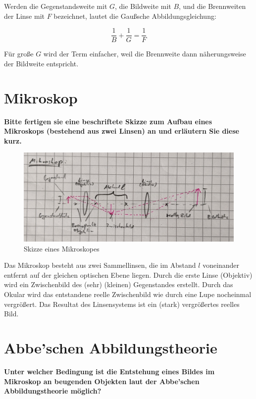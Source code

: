 \documentclass[a4paper, 12pt]{article}
\begin{document}
Werden die Gegenstandsweite mit $G$, die Bildweite mit $B$, und die Brennweiten der Linse mit $F$ bezeichnet, lautet die Gaußsche Abbildungsgleichung:

$$\frac{1}{B}+\frac{1}{G} = \frac{1}{F}$$

Für große $G$ wird der Term einfacher, weil die Brennweite dann näherungsweise der Bildweite entspricht.

\newpage
\section{Mikroskop}
\textbf{Bitte fertigen sie eine beschriftete Skizze zum Aufbau eines Mikroskops (bestehend aus zwei Linsen) an und erläutern Sie diese kurz.}

\begin{figure}[h]
\centering
	\includegraphics[width=\textwidth]{mikroskop.png}
	\caption{Skizze eines Mikroskopes}
\end{figure}

Das Mikroskop besteht aus zwei Sammellinsen, die im Abstand $l$ voneinander entfernt auf der gleichen optischen Ebene liegen. 
Durch die erste Linse (Objektiv) wird ein Zwischenbild des (sehr) (kleinen) Gegenstandes erstellt.
Durch das Okular wird das entstandene reelle Zwischenbild wie durch eine Lupe nocheinmal vergrößert. 
Das Resultat des Linsensystems ist ein (stark) vergrößertes reelles Bild.
 
 \newpage
\section{Abbe’schen Abbildungstheorie}
\textbf{Unter welcher Bedingung ist die Entstehung eines Bildes im Mikroskop an beugenden Objekten laut der Abbe’schen Abbildungstheorie möglich?}
\end{document}
